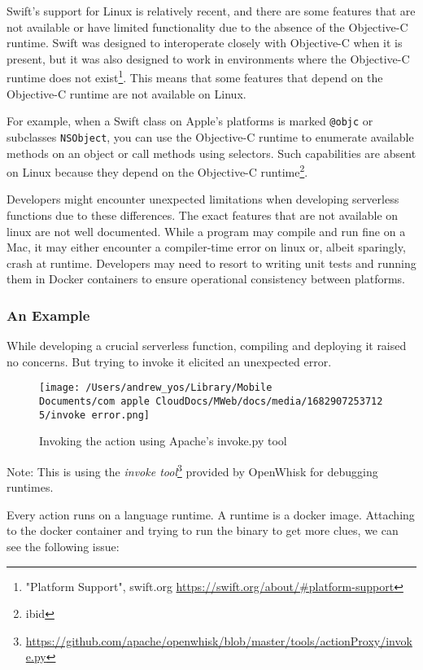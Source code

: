 Swift's support for Linux is relatively recent, and there are some features that are not available or have limited functionality due to the absence of the Objective-C runtime. Swift was designed to interoperate closely with Objective-C when it is present, but it was also designed to work in environments where the Objective-C runtime does not exist\footnote{"Platform Support", swift.org \url{https://swift.org/about/#platform-support}}. This means that some features that depend on the Objective-C runtime are not available on Linux.

For example, when a Swift class on Apple’s platforms is marked \texttt{@objc} or subclasses \texttt{NSObject}, you can use the Objective-C runtime to enumerate available methods on an object or call methods using selectors. Such capabilities are absent on Linux because they depend on the Objective-C runtime\footnote{ibid}.

Developers might encounter unexpected limitations when developing serverless functions due to these differences. The exact features that are not available on linux are not well documented. While a program may compile and run fine on a Mac, it may either encounter a compiler-time error on linux or, albeit sparingly, crash at runtime. Developers may need to resort to writing unit tests and running them in Docker containers to ensure operational consistency between platforms.

\subsubsection{An Example}

While developing a crucial serverless function, compiling and deploying it raised no concerns. But trying to invoke it elicited an unexpected error.

\begin{figure}[h]
    \centering
    \texttt{[image: /Users/andrew\_yos/Library/Mobile Documents/com~apple~CloudDocs/MWeb/docs/media/16829072537125/invoke error.png]}
    \caption{Invoking the action using Apache's invoke.py tool}
\end{figure}

\noindent Note: This is using the \textit{invoke tool}\footnote{\url{https://github.com/apache/openwhisk/blob/master/tools/actionProxy/invoke.py}} provided by OpenWhisk for debugging runtimes.

Every action runs on a language runtime. A runtime is a docker image. Attaching to the docker container and trying to run the binary to get more clues, we can see the following issue:

